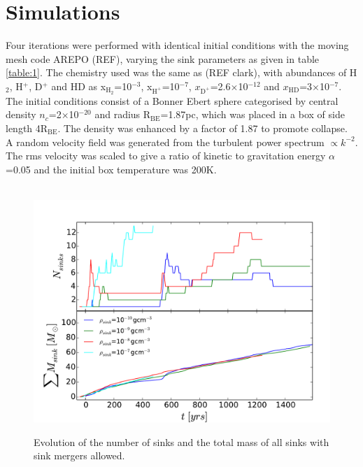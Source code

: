 \documentclass[fleqn,usenatbib]{mnras}
\begin{document}
\section{Simulations}
Four iterations were performed with identical initial conditions with the moving mesh code AREPO (REF), varying the sink parameters as given in table \ref{table:1}. The chemistry used was the same as (REF clark), with abundances of H$_2$, H$^{+}$, D$^{+}$ and HD as x$_{\text{H}_{2}}$=10$^{-3}$, x$_{\text{H}^{+}}$=10$^{-7}$, $x_{\text{D}^{+}}$=2.6$\times$10$^{-12}$ and $x_{\text{HD}}$=3$\times$10$^{-7}$. The initial conditions consist of a Bonner Ebert sphere categorised by central density $n_c$=2$\times$10$^{-20}$ and radius R$_{\text{BE}}$=1.87pc, which was placed in a box of side length 4R$_{\text{BE}}$. The density was enhanced by a factor of 1.87 to promote collapse. A random velocity field was generated from the turbulent power spectrum $\propto k^{-2}$. The rms velocity was scaled to give a ratio of kinetic to gravitation energy $\alpha$=0.05 and the initial box temperature was 200K.

\begin{figure}
	\hbox{\hspace{-0.8cm} \includegraphics[scale=0.5]{sink_mergers.pdf}}
    \caption{Evolution of the number of sinks and the total mass of all sinks with sink mergers allowed.}
    \label{fig:sinks}
\end{figure}
\end{document}
